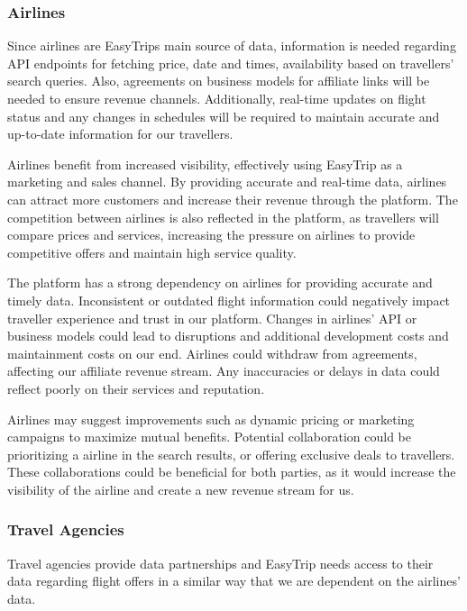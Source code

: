 \subsubsection{Airlines}
Since airlines are EasyTrips main source of data, information is needed regarding API endpoints for fetching price, date and times, availability based on travellers' search queries. Also, agreements on business models for affiliate links will be needed to ensure revenue channels. Additionally, real-time updates on flight status and any changes in schedules will be required to maintain accurate and up-to-date information for our travellers.

Airlines benefit from increased visibility, effectively using EasyTrip as a marketing and sales channel. By providing accurate and real-time data, airlines can attract more customers and increase their revenue through the platform. The competition between airlines is also reflected in the platform, as travellers will compare prices and services, increasing the pressure on airlines to provide competitive offers and maintain high service quality.

The platform has a strong dependency on airlines for providing accurate and timely data. Inconsistent or outdated flight information could negatively impact traveller experience and trust in our platform. Changes in airlines' API or business models could lead to disruptions and additional development costs and maintainment costs on our end. Airlines could withdraw from agreements, affecting our affiliate revenue stream. Any inaccuracies or delays in data could reflect poorly on their services and reputation.

Airlines may suggest improvements such as dynamic pricing or marketing campaigns to maximize mutual benefits. Potential collaboration could be prioritizing a airline in the search results, or offering exclusive deals to travellers. These collaborations could be beneficial for both parties, as it would increase the visibility of the airline and create a new revenue stream for us.

\subsubsection{Travel Agencies}
Travel agencies provide data partnerships and EasyTrip needs access to their data regarding flight offers in a similar way that we are dependent on the airlines' data.

